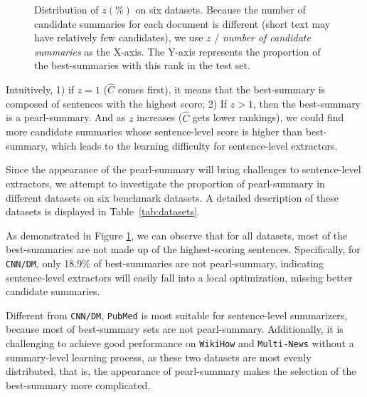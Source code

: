 \begin{figure}[ht!]
  \centering
 \caption{Distribution of $z(\%)$ on six datasets. Because the number of candidate summaries for each document is different (short text may have relatively few candidates), we use $z$ / \textit{number of candidate summaries} as the X-axis. The Y-axis represents the proportion of the best-summaries with this rank in the test set.}
 \label{fig:dataset_fusion}
\end{figure}

Intuitively,
1) if $z=1$ ($\hat{C}$ comes first), it means that the best-summary is composed of sentences with the highest score;
2) If $z>1$, then the best-summary is a pearl-summary. And as $z$ increases ($\hat{C}$ gets lower rankings), we could find more candidate summaries whose sentence-level score is higher than best-summary, which leads to the learning difficulty for sentence-level extractors.

Since the appearance of the pearl-summary will bring challenges to sentence-level extractors, we attempt to investigate the proportion of pearl-summary in different datasets on six benchmark datasets. A detailed description of these datasets is displayed in Table~\ref{tab:datasets}.

As demonstrated in Figure \ref{fig:dataset_fusion}, we can observe that for all datasets,  most of the best-summaries are not made up of the highest-scoring sentences.
Specifically, for \texttt{CNN/DM}, only 18.9\% of best-summaries are not pearl-summary, indicating sentence-level extractors will easily fall into a local optimization, missing better candidate summaries.

Different from \texttt{CNN/DM}, \texttt{PubMed} is most suitable for sentence-level summarizers, because most of best-summary sets are not pearl-summary.
Additionally, it is challenging to achieve good performance on \texttt{WikiHow} and \texttt{Multi-News} without a summary-level learning process, as these two datasets are most evenly distributed, that is, the appearance of pearl-summary makes the selection of the best-summary more complicated.

